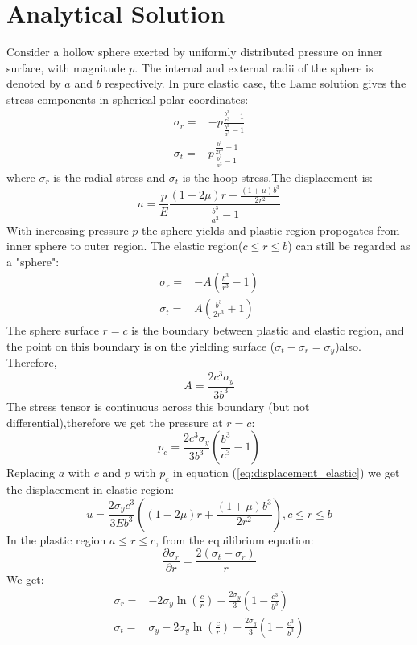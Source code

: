 \documentclass{article}
\begin{document}
\section{Analytical Solution}
Consider a hollow sphere exerted by uniformly distributed pressure on inner surface, with magnitude $p$. The internal and external radii of the sphere is denoted by $a$ and $b$ respectively.
In pure elastic case, the Lame solution gives the stress components in spherical polar coordinates:
\begin{align}
\sigma_r=&-p\frac{\frac{b^3}{r^3}-1}{\frac{b^3}{a^3}-1}\\
\sigma_{t}=&p\frac{\frac{b^3}{2r^3}+1}{\frac{b^3}{a^3}-1}
\end{align}
where $\sigma_r$ is the radial stress and $\sigma_t$ is the hoop stress.The displacement is:
\begin{equation}\label{eq:displacement_elastic}
u=\frac{p}{E}\frac{(1-2\mu)r+\frac{(1+\mu)b^3}{2r^2}}{\frac{b^3}{a^3}-1}
\end{equation}
With increasing pressure $p$ the sphere yields and plastic region propogates from inner sphere to outer region. The elastic region($c\leq r \leq b$) can still be regarded as a "sphere":
\begin{align}
\sigma_r=&-A(\frac{b^3}{r^3}-1)\\
\sigma_{t}=&A(\frac{b^3}{2r^3}+1)
\end{align}
The sphere surface $r=c$ is the boundary between plastic and elastic region, and the point on this boundary is on the yielding surface ($\sigma_t-\sigma_r=\sigma_y$)also.
Therefore,
\[
A=\frac{2c^3\sigma_y}{3b^3}
\]
The stress tensor is continuous across this boundary (but not differential),therefore we get the pressure at $r=c$:
\[
p_{c}=\frac{2c^3\sigma_y}{3b^3}(\frac{b^3}{c^3}-1)
\]
Replacing $a$ with $c$ and $p$ with $p_c$ in equation (\ref{eq:displacement_elastic}) we get the displacement in elastic region:
\begin{equation}
u=\frac{2\sigma_y c^3}{3Eb^3}\left((1-2\mu)r+\frac{(1+\mu)b^3}{2r^2}\right),c\leq r\leq b
\end{equation}
In the plastic region $a\leq r\leq c$, from the equilibrium equation:
\[
\frac{\partial \sigma_r}{\partial{r}}=\frac{2(\sigma_t-\sigma_r)}{r}
\]
We get:
\begin{align}
\sigma_r=&-2\sigma_y\ln(\frac{c}{r})-\frac{2\sigma_y}{3}(1-\frac{c^3}{b^3})\\
\sigma_t=&\sigma_y-2\sigma_y\ln(\frac{c}{r})-\frac{2\sigma_y}{3}(1-\frac{c^3}{b^3})
\end{align}
\end{document}
